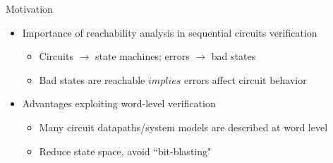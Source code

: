 \documentclass[xcolor=dvipsnames]{beamer}
\newcommand{\bi}{\begin{itemize}}
\newcommand{\ei}{\end{itemize}}
\begin{document}

\begin{frame}{\large {Motivation}}
\vspace{-0.2in}

\begin{itemize}
\item Importance of reachability analysis in sequential circuits verification
	\begin{itemize}
	\item Circuits $\to$ state machines; errors $\to$ bad states
	\item Bad states are reachable $implies$ errors affect circuit behavior
	\end{itemize}	
\end{itemize}

\begin{itemize}
\item Advantages exploiting word-level verification
	\begin{itemize}
	\item Many circuit datapaths/system models are described at word level
	\item Reduce state space, avoid ``bit-blasting"
	\end{itemize}	
\end{itemize}
% 




\end{frame}
\end{document}
